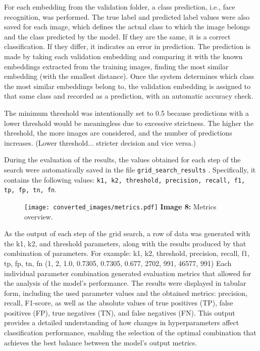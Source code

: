 \documentclass{article}
\begin{document}
\hspace*{1.00cm}For each embedding from the validation folder, a class prediction, i.e., face recognition, was performed. The true label and predicted label values were also saved for each image, which defines the actual class to which the image belongs and the class predicted by the model. If they are the same, it is a correct classification. If they differ, it indicates an error in prediction. The prediction is made by taking each validation embedding and comparing it with the known embeddings extracted from the training images, finding the most similar embedding (with the smallest distance). Once the system determines which class the most similar embeddings belong to, the validation embedding is assigned to that same class and recorded as a prediction, with an automatic accuracy check.

\hspace*{1.00cm}The minimum threshold was intentionally set to 0.5 because predictions with a lower threshold would be meaningless due to excessive strictness. The higher the threshold, the more images are considered, and the number of predictions increases. (Lower threshold... stricter decision and vice versa.)

\hspace*{1.00cm}During the evaluation of the results, the values obtained for each step of the search were automatically saved in the file \texttt{grid\_search\_results} . Specifically, it contains the following values: \texttt{k1, k2, threshold, precision, recall, f1, tp, fp, tn, fn}.\cite{powers2011evaluation}

\begin{figure}[H]
    \centering
    \texttt{[image: converted\_images/metrics.pdf]}
    \textbf{Image 8:} Metrics overview.
\end{figure}


\hspace*{1.00cm}As the output of each step of the grid search, a row of data was generated with the k1, k2, and threshold parameters, along with the results produced by that combination of parameters. For example:
k1, k2, threshold, precision, recall, f1, tp, fp, tn, fn
 (1, 2, 1.0, 0.7305, 0.7305, 0.677, 2702, 991, 46577, 991)
Each individual parameter combination generated evaluation metrics that allowed for the analysis of the model's performance. The results were displayed in tabular form, including the used parameter values and the obtained metrics: precision, recall, F1-score, as well as the absolute values of true positives (TP), false positives (FP), true negatives (TN), and false negatives (FN). This output provides a detailed understanding of how changes in hyperparameters affect classification performance, enabling the selection of the optimal combination that achieves the best balance between the model's output metrics. 
\end{document}
